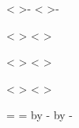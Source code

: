 {{{{{                                            \xdef\r@p@sbburx{-\number\dimen100}
                                            \xdef\r@p@sbbury{-\number\dimen100}}
%
                        \def\minmaxtest{
                           \ifnum\number\p@intvaluex<\r@p@sbbllx
                              \xdef\r@p@sbbllx{\number\p@intvaluex}\fi
                           \ifnum\number\p@intvaluex>\r@p@sbburx
                              \xdef\r@p@sbburx{\number\p@intvaluex}\fi
                           \ifnum\number\p@intvaluey<\r@p@sbblly
                              \xdef\r@p@sbblly{\number\p@intvaluey}\fi
                           \ifnum\number\p@intvaluey>\r@p@sbbury
                              \xdef\r@p@sbbury{\number\p@intvaluey}\fi
                           }
                        \rotate@{\@p@sbbllx}{\@p@sbblly}
                        \minmaxtest
                        \rotate@{\@p@sbbllx}{\@p@sbbury}
                        \minmaxtest
                        \rotate@{\@p@sbburx}{\@p@sbblly}
                        \minmaxtest
                        \rotate@{\@p@sbburx}{\@p@sbbury}
                        \minmaxtest
                        \edef\@p@sbbllx{\r@p@sbbllx}\edef\@p@sbblly{\r@p@sbblly}
                        \edef\@p@sbburx{\r@p@sbburx}\edef\@p@sbbury{\r@p@sbbury}
                \fi
                =\@p@sbburx
                =\@p@sbbury
                \advance{} by -\@p@sbbllx
                \advance{} by -\@p@sbblly
                \edef\@bbw{\number\count203}
                \edef\@bbh{\number\count204}
}
%
%
\def\in@hundreds#1#2#3{\count240=#2 \count241=#3
                     \count100=\count240        %
                     \divide\count100 by \count241
                     \count101=\count100
                     \multiply\count101 by \count241
                     \advance\count240 by -\count101
                     \multiply\count240 by 10
                     \count101=\count240        %
                     \divide\count101 by \count241
                     \count102=\count101
}}}}
